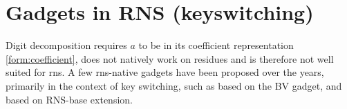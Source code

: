 
\section{Gadgets in RNS (keyswitching)}
Digit decomposition requires $a$ to be in its coefficient representation \eqref{form:coefficient}, does not natively work on residues and is therefore not well suited for \gls{rns}. A few \gls{rns}-native gadgets have been proposed over the years, primarily in the context of key switching, such as \cite{cryptoeprint:2016/510, cryptoeprint:2018/117} based on the BV gadget, and \cite{cryptoeprint:2012/099} based on RNS-base extension. %




